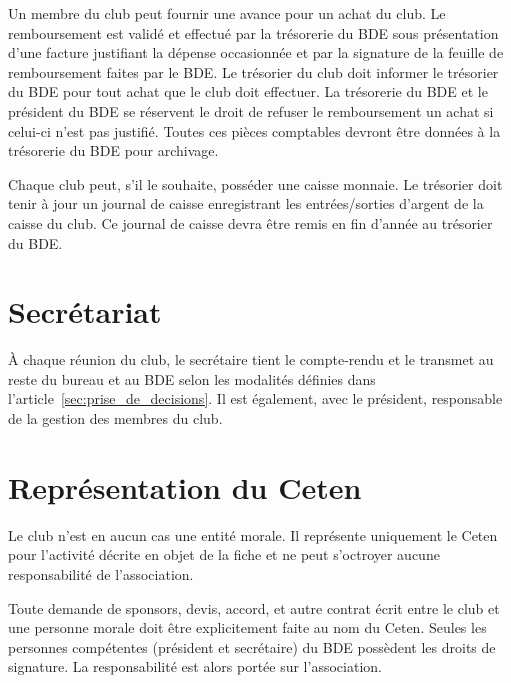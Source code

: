 \documentclass{article}
\begin{document}
\begin{multicols}{2}
{			Un membre du club peut fournir une avance pour un achat du club. Le
			remboursement est validé et effectué par la trésorerie du BDE sous
			présentation d’une facture justifiant la dépense occasionnée et par
			la signature de la feuille de remboursement faites par le BDE\@. Le
			trésorier du club doit informer le trésorier du BDE pour tout achat
			que le club doit effectuer. La trésorerie du BDE et le président du
			BDE se réservent le droit de refuser le remboursement un achat si
			celui-ci n’est pas justifié. Toutes ces pièces comptables devront
			être données à la trésorerie du BDE pour archivage.

			Chaque club peut, s’il le souhaite, posséder une caisse
			monnaie. Le trésorier doit tenir à jour un journal de caisse
			enregistrant les entrées/sorties d’argent de la caisse du
			club. Ce journal de caisse devra être remis en fin d’année au
			trésorier du BDE\@.

		}

		\section{Secrétariat}
\label{sec:secretariat}

		{\small
		
			À chaque réunion du club, le secrétaire tient le compte-rendu et le
			transmet au reste du bureau et au BDE selon les modalités définies
			dans l'article~\ref{sec:prise_de_decisions}. Il est également, avec
			le président, responsable de la gestion des membres du club.
		
		}

		\section{Représentation du Ceten}
\label{sec:representation_du_ceten}

		{\small

			Le club n’est en aucun cas une entité morale. Il représente
			uniquement le Ceten pour l’activité décrite en objet de la fiche et
			ne peut s’octroyer aucune responsabilité de l’association.

			Toute demande de sponsors, devis, accord, et autre contrat écrit
			entre le club et une personne morale doit être explicitement faite
			au nom du Ceten. Seules les personnes compétentes (président et
			secrétaire) du BDE possèdent les droits de signature. La
			responsabilité est alors portée sur l’association.

}
\end{multicols}
\end{document}
